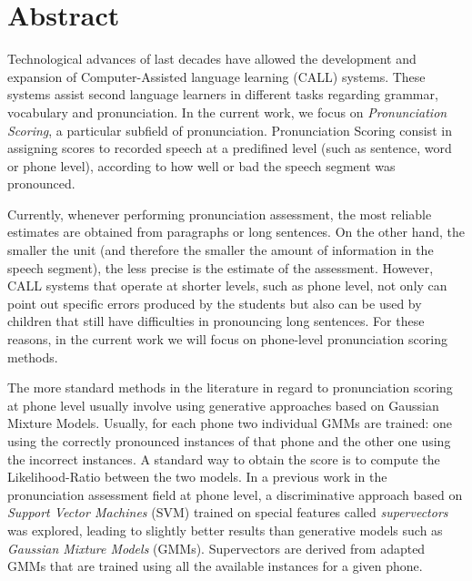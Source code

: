 \chapter*{Abstract}

\noindent
Technological advances of last decades have allowed the development and expansion
of Computer-Assisted language learning (CALL) systems. These systems assist
second language learners in different tasks regarding grammar, vocabulary and
pronunciation. In the current work, we focus on \textit{Pronunciation Scoring},
a particular subfield of pronunciation. Pronunciation Scoring consist in
assigning scores to recorded speech at a predifined
level (such as sentence, word or phone level), according to how well or bad
the speech segment was pronounced.

Currently, whenever performing pronunciation assessment, the most reliable estimates are
obtained from paragraphs or long sentences. On the other hand, the smaller the unit
(and therefore the smaller the amount of information in the speech segment),
the less precise is
the estimate of the assessment.
However, CALL systems that operate at shorter levels, such
as phone level,
not only can point out specific errors produced by the students but also
can be used by children that still have difficulties in pronouncing long sentences.
For these reasons,
in the current work we will focus on phone-level pronunciation scoring methods.


The more standard methods in the literature in regard to pronunciation scoring at
phone level usually involve using generative approaches
based on Gaussian Mixture Models.
Usually, for each phone two individual GMMs are trained: one using the correctly
pronounced instances of that phone and the other one using the incorrect instances.
A standard way to obtain the score is to compute the
Likelihood-Ratio between the two models.
In a previous work in the pronunciation assessment field at phone level, a discriminative
approach based on \textit{Support Vector Machines} (SVM) trained on special features
called \textit{supervectors} was explored, leading to slightly better results than
generative models such as \textit{Gaussian Mixture Models} (GMMs). Supervectors
are derived from adapted GMMs that are trained using all the available
instances for a given phone.

